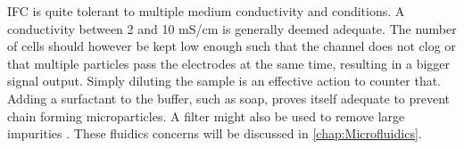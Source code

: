 IFC is quite tolerant to multiple medium conductivity and conditions. A conductivity between 2 and 10 mS/cm is generally deemed adequate. The number of cells should however be kept low enough such that the channel does not clog or that multiple particles pass the electrodes at the same time, resulting in a bigger signal output. Simply diluting the sample is an effective action to counter that. Adding a surfactant to the buffer, such as soap, proves itself adequate to prevent chain forming microparticles. A filter might also be used to remove large impurities \cite{Opitz2019}. These fluidics concerns will be discussed in \autoref{chap:Microfluidics}.